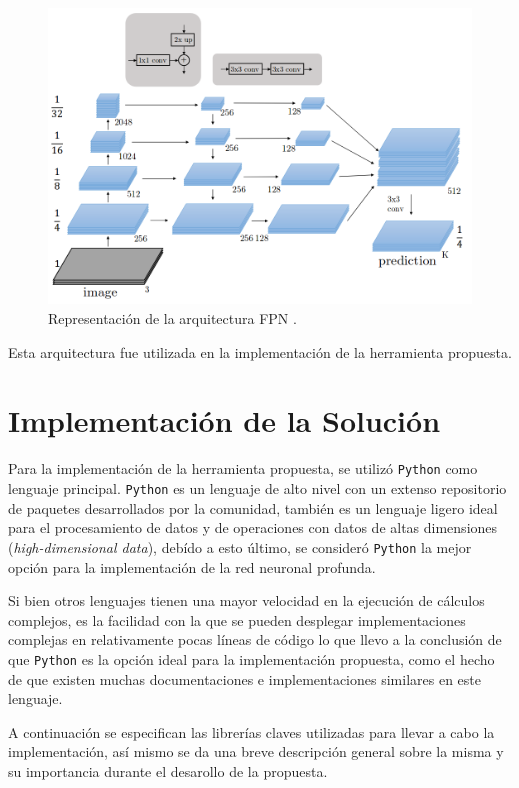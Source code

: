 \begin{figure}[H]
    \centering
    \includegraphics[scale=0.30]{Figuras/fpn_ar.png}
    \caption{Representación de la arquitectura FPN \citep{fpn_2}.}
    \label{fig:fpn_map}
\end{figure}

Esta arquitectura fue utilizada en la implementación de la herramienta propuesta.

\section{Implementación de la Solución}
Para la implementación de la herramienta propuesta, se utilizó \texttt{Python} como lenguaje principal. \texttt{Python} es un lenguaje de alto nivel con un extenso repositorio de paquetes desarrollados por la comunidad, también es un lenguaje ligero ideal para el procesamiento de datos y de operaciones con datos de altas dimensiones (\emph{high-dimensional data}), debído a esto último, se consideró \texttt{Python} la mejor opción para la implementación de la red neuronal profunda.

Si bien otros lenguajes tienen una mayor velocidad en la ejecución de cálculos complejos, es la facilidad con la que se pueden desplegar implementaciones complejas en relativamente pocas líneas de código lo que llevo a la conclusión de que \texttt{Python} es la opción ideal para la implementación propuesta, como el hecho de que existen muchas documentaciones e implementaciones similares en este lenguaje.

A continuación se especifican las librerías claves utilizadas para llevar a cabo la implementación, así mismo se da una breve descripción general sobre la misma y su importancia durante el desarollo de la propuesta.

